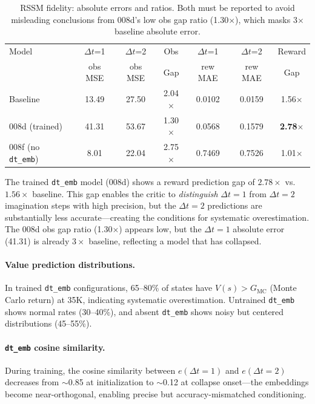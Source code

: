 \documentclass[letterpaper]{article}
\newcommand{\dtemb}{\texttt{dt\_emb}\xspace}
\begin{document}
\begin{table}[h]
\centering
\caption{RSSM fidelity: absolute errors and ratios. Both must be reported to avoid misleading conclusions from 008d's low obs gap ratio (1.30$\times$), which masks 3$\times$ baseline absolute error.}
\label{tab:rssm_fidelity}
\begin{tabular}{lcccccc}
\toprule
Model & $\Delta t$=1 & $\Delta t$=2 & Obs & $\Delta t$=1 & $\Delta t$=2 & Reward \\
 & obs MSE & obs MSE & Gap & rew MAE & rew MAE & Gap \\
\midrule
Baseline & 13.49 & 27.50 & 2.04$\times$ & 0.0102 & 0.0159 & 1.56$\times$ \\
008d (trained) & 41.31 & 53.67 & 1.30$\times$ & 0.0568 & 0.1579 & \textbf{2.78$\times$} \\
008f (no \dtemb) & 8.01 & 22.04 & 2.75$\times$ & 0.7469 & 0.7526 & 1.01$\times$ \\
\bottomrule
\end{tabular}
\end{table}

The trained \dtemb model (008d) shows a reward prediction gap of $2.78\times$ vs.\ $1.56\times$ baseline. This gap enables the critic to \emph{distinguish} $\Delta t = 1$ from $\Delta t = 2$ imagination steps with high precision, but the $\Delta t = 2$ predictions are substantially less accurate---creating the conditions for systematic overestimation. The 008d obs gap ratio (1.30$\times$) appears low, but the $\Delta t = 1$ absolute error (41.31) is already $3\times$ baseline, reflecting a model that has collapsed.

\paragraph{Value prediction distributions.}
In trained \dtemb configurations, 65--80\% of states have $V(s) > G_{\text{MC}}$ (Monte Carlo return) at 35K, indicating systematic overestimation. Untrained \dtemb shows normal rates (30--40\%), and absent \dtemb shows noisy but centered distributions (45--55\%).

\paragraph{\dtemb cosine similarity.}
During training, the cosine similarity between $e(\Delta t = 1)$ and $e(\Delta t = 2)$ decreases from $\sim$0.85 at initialization to $\sim$0.12 at collapse onset---the embeddings become near-orthogonal, enabling precise but accuracy-mismatched conditioning.
\end{document}
